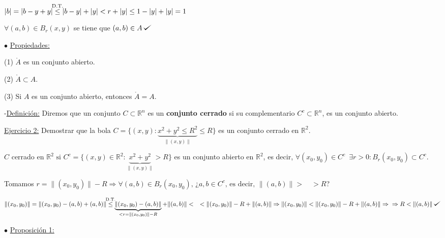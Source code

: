 \documentclass[12pt, titlepage]{article}
\def\checkmark{\tikz\fill[scale=0.4](0,.35) -- (.25,0) -- (1,.7) -- (.25,.15) -- cycle;}
\newcommand{\leqc}[1]{\stackrel{\mathclap{\normalfont\mbox{\scriptsize{#1}}}}{\leq}}
\newcommand{\R}{\mathbb{R}}
\newcommand{\spac}{\, \, \,}
\begin{document}
$|b| = |b - y + y| \leqc{D.T.} |b - y| +|y| < r + |y| \leq 1 - |y| + |y| = 1$
\vspace{3mm}

$\forall (a, b) \in B_r(x, y)$ se tiene que $(a, b) \in A \, \checkmark$
\vspace{5mm}


\noindent$\bullet$ \underline{Propiedades:}
\vspace{3mm}

(1) $\mathring{A}$ es un conjunto abierto.
\vspace{3mm}

(2) $\mathring{A} \subset A$.
\vspace{3mm}

(3) Si $A$ es un conjunto abierto, entonces $\mathring{A} = A$.
\vspace{5mm}


\noindent-\underline{Definición:} Diremos que un conjunto $C \subset \R^n$ es un \textbf{conjunto
 cerrado} si su complementario $C^c \subset \R^n$, es un conjunto abierto.
\vspace{3mm}

\underline{Ejercicio 2:} Demostrar que la bola $C = \{ (x, y) : \underbrace{x^2 + y^2 \leq R^2}_{\|(x, y
)\|} \leq R\}$ es un conjunto cerrado en $\R^2$.
\vspace{3mm}

$C$  cerrado en $\R^2 \text{ si } C^c = \{(x, y) \in \R^2 : \underbrace{x^2 + y^2}_{\|(x, y)\|} > R\}$ es
 un conjunto abierto en $\R^2$, es decir, $\forall (x_0, y_0) \in C^c \spac \exists r > 0 : B_r (x_0, y_0)
 \subset C^c$.
\vspace{3mm}

Tomamos $r = \| (x_0, y_0) \| - R \Rightarrow \forall (a, b) \in B_r (x_0, y_0) \text{, ¿} a, b \in C^c \text{,
 es decir, } \| (a, b) \| > \quad > R$?
\vspace{2mm}

$\| (x_0, y_0) \| = \| (x_0, y_0) - (a, b) + (a, b) \| \leqc{D.T.} \underbrace{\| (x_0, y_0) - (a, b) \|}_{< r =
 \| (x_0, y_0) \| - R} + \| (a, b) \| < \quad < \| (x_0, y_0) \| - R + \| (a, b) \| \Rightarrow \| (x_0, y_0) \| <
 \| (x_0, y_0) \| - R + \| (a, b) \| \Rightarrow \\ \Rightarrow R < \| (a, b) \| \, \checkmark$
\vspace{5mm}

\noindent$\bullet$ \underline{Proposición 1:}
\vspace{3mm}
\end{document}
